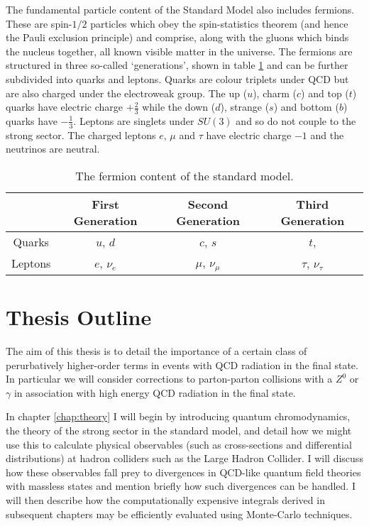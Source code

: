 	The fundamental particle content of the Standard Model also includes fermions. These are spin-$1/2$
	particles which obey the spin-statistics theorem (and hence the Pauli exclusion principle) and
	comprise, along with the gluons which binds the nucleus together, all known visible matter in the
	universe. The fermions are structured in three so-called `generations', shown in table \ref{tab:fermions}
	and can be further subdivided into quarks and leptons. Quarks are colour triplets under QCD but are
	also charged under the electroweak group.  The up ($u$), charm ($c$) and top ($t$) quarks have electric
	charge $+\frac{2}{3}$ while the down ($d$), strange ($s$) and bottom ($b$) quarks have $-\frac{1}{3}$.
	Leptons are singlets under $SU(3)$ and so do not couple to the strong sector.  The charged leptons
	$e$, $\mu$ and $\tau$ have electric charge $-1$ and the neutrinos are neutral.

	\begin{table}[htp!]
	\begin{center}
	\begin{tabular}{c | c | c | c}
	        & First Generation & Second Generation & Third Generation   \\ \hline
	Quarks  &  $u$, $d$        & $c$, $s$          & $t$,               \\ \hline
	Leptons &  $e$, $\nu_e$    & $\mu$, $\nu_\mu$  & $\tau$, $\nu_\tau$ \\
	\end{tabular}
	\caption{The fermion content of the standard model.}
	\label{tab:fermions}
	\end{center}
	\end{table}

\section{Thesis Outline}
\label{sec:outline}

	The aim of this thesis is to detail the importance of a certain class of perurbatively higher-order terms
	in events with QCD radiation in the final state.  In particular we will consider corrections to parton-parton
	collisions with a $Z^0$ or $\gamma$ in association with high energy QCD radiation in the final state.

	In chapter \ref{chap:theory} I will begin by introducing quantum chromodynamics, the theory of the strong
	sector in the standard model, and detail how we might use this to calculate physical observables (such as
	cross-sections and differential distributions) at hadron colliders such as the Large Hadron Collider.  I
	will discuss how these observables fall prey to divergences in QCD-like quantum field theories with massless
	states and mention briefly how such divergences can be handled.  I will then describe how the computationally
	expensive integrals derived in subsequent chapters may be efficiently evaluated using Monte-Carlo techniques.

